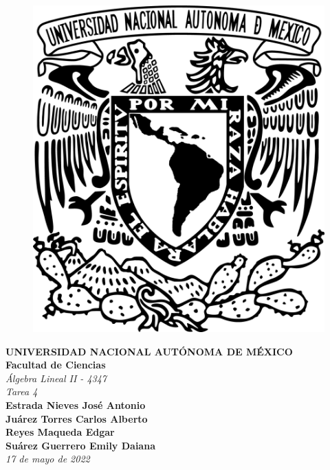 \begin{center}
    \begin{figure}
        \raggedright
        \includegraphics[scale=0.2]{UNAM.png}
        \label{fig:my_label}
    \end{figure}
    
    \textbf{\Large{UNIVERSIDAD NACIONAL AUTÓNOMA DE MÉXICO}}\\
    \vspace{1cm}
    \textbf{\Large{Facultad de Ciencias}}\\
    \vspace{1cm}
    \textit{\Large{\'Algebra Lineal II - 4347}}\\
    \vspace{1cm}
    \textit{\large{Tarea 4}}\\
    \vspace{1cm}
    \textbf{\large{Estrada Nieves Jos\'e Antonio}}\\
    \vspace{1cm}
    \textbf{\large{Ju\'arez Torres Carlos Alberto}}\\
    \vspace{1cm}
    \textbf{\large{Reyes Maqueda Edgar}}\\
    \vspace{1cm}
    \textbf{\large{Su\'arez Guerrero Emily Daiana}}\\
    \vspace{1cm}
    \textit{\large{17 de mayo de 2022}}
    

\end{center}
